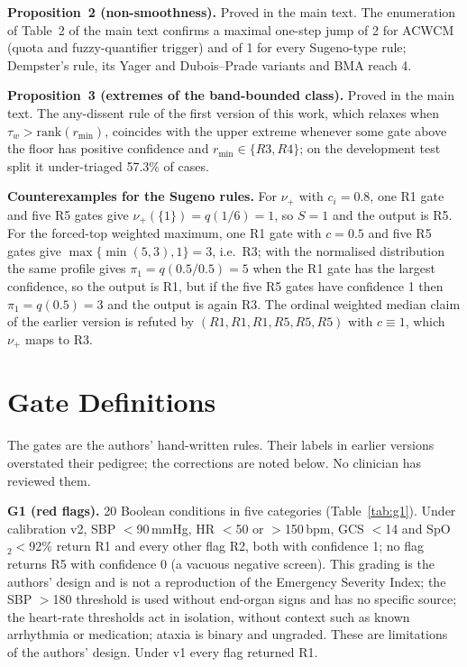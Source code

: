 \documentclass[11pt,a4paper]{article}%
\theoremstyle{plain}%
\theoremstyle{remark}%
\begin{document}
\textbf{Proposition~2 (non-smoothness).} Proved in the main text. The enumeration of Table~2 of the main text confirms a maximal one-step jump of 2 for ACWCM (quota and fuzzy-quantifier trigger) and of 1 for every Sugeno-type rule; Dempster's rule, its Yager and Dubois--Prade variants and BMA reach 4.

\textbf{Proposition~3 (extremes of the band-bounded class).} Proved in the main text. The any-dissent rule of the first version of this work, which relaxes when $\tau_w>\text{rank}(r_{\min})$, coincides with the upper extreme whenever some gate above the floor has positive confidence and $r_{\min}\in\{R3,R4\}$; on the development test split it under-triaged 57.3\% of cases.

\textbf{Counterexamples for the Sugeno rules.} For $\nu_+$ with $c_i=0.8$, one R1 gate and five R5 gates give $\nu_+(\{1\})=q(1/6)=1$, so $S=1$ and the output is R5. For the forced-top weighted maximum, one R1 gate with $c=0.5$ and five R5 gates give $\max\{\min(5,3),1\}=3$, i.e.\ R3; with the normalised distribution the same profile gives $\pi_1=q(0.5/0.5)=5$ when the R1 gate has the largest confidence, so the output is R1, but if the five R5 gates have confidence 1 then $\pi_1=q(0.5)=3$ and the output is again R3. The ordinal weighted median claim of the earlier version is refuted by $(R1,R1,R1,R5,R5,R5)$ with $c\equiv1$, which $\nu_+$ maps to R3.

\section{Gate Definitions}\label{sup:gates}

The gates are the authors' hand-written rules. Their labels in earlier versions overstated their pedigree; the corrections are noted below. No clinician has reviewed them.

\textbf{G1 (red flags).} 20 Boolean conditions in five categories (Table~\ref{tab:g1}). Under calibration v2, SBP $<$90\,mmHg, HR $<$50 or $>$150\,bpm, GCS $<$14 and SpO$_2<$92\% return R1 and every other flag R2, both with confidence 1; no flag returns R5 with confidence 0 (a vacuous negative screen). This grading is the authors' design and is not a reproduction of the Emergency Severity Index; the SBP $>$180 threshold is used without end-organ signs and has no specific source; the heart-rate thresholds act in isolation, without context such as known arrhythmia or medication; ataxia is binary and ungraded. These are limitations of the authors' design. Under v1 every flag returned R1.
\end{document}
